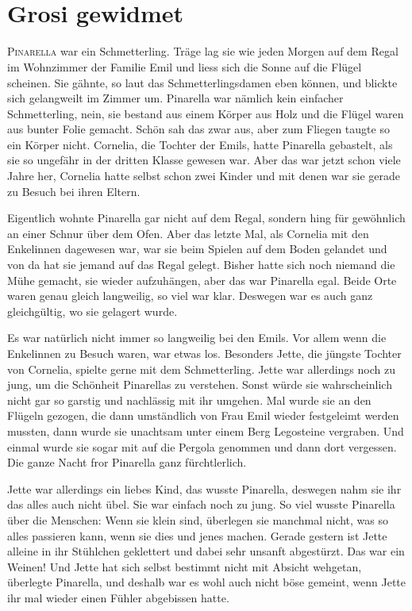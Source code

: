 \chapter*{{}\\\small \color{red} Grosi gewidmet}
\lettrine[lines=3]{\color{red}P}{inarella} war ein Schmetterling. Träge lag sie wie jeden Morgen auf dem Regal im Wohnzimmer der Familie Emil und liess sich die Sonne auf die Flügel scheinen. Sie gähnte, so laut das Schmetterlingsdamen eben können, und blickte sich gelangweilt im Zimmer um. Pinarella war nämlich kein einfacher Schmetterling, nein, sie bestand aus einem Körper aus Holz und die Flügel waren aus bunter Folie gemacht. Schön sah das zwar aus, aber zum Fliegen taugte so ein Körper nicht. Cornelia, die Tochter der Emils, hatte Pinarella gebastelt, als sie so ungefähr in der dritten Klasse gewesen war. Aber das war jetzt schon viele Jahre her, Cornelia hatte selbst schon zwei Kinder und mit denen war sie gerade zu Besuch bei ihren Eltern. 

Eigentlich wohnte Pinarella gar nicht auf dem Regal, sondern hing für gewöhnlich an einer Schnur über dem Ofen. Aber das letzte Mal, als Cornelia mit den Enkelinnen dagewesen war, war sie beim Spielen auf dem Boden gelandet und von da hat sie jemand auf das Regal gelegt. Bisher hatte sich noch niemand die Mühe gemacht, sie wieder aufzuhängen, aber das war Pinarella egal. Beide Orte waren genau gleich langweilig, so viel war klar. Deswegen war es auch ganz gleichgültig, wo sie gelagert wurde.

Es war natürlich nicht immer so langweilig bei den Emils. Vor allem wenn die Enkelinnen zu Besuch waren, war etwas los. Besonders Jette, die jüngste Tochter von Cornelia, spielte gerne mit dem Schmetterling. Jette war allerdings noch zu jung, um die Schönheit Pinarellas zu verstehen. Sonst würde sie wahrscheinlich nicht gar so garstig und nachlässig mit ihr umgehen. Mal wurde sie an den Flügeln gezogen, die dann umständlich von Frau Emil wieder festgeleimt werden mussten, dann wurde sie unachtsam unter einem Berg Legosteine vergraben. Und einmal wurde sie sogar mit auf die Pergola genommen und dann dort vergessen. Die ganze Nacht fror Pinarella ganz fürchtlerlich.

Jette war allerdings ein liebes Kind, das wusste Pinarella, deswegen nahm sie ihr das alles auch nicht übel. Sie war einfach noch zu jung. So viel wusste Pinarella über die Menschen: Wenn sie klein sind, überlegen sie manchmal nicht, was so alles passieren kann, wenn sie dies und jenes machen. Gerade gestern ist Jette alleine in ihr Stühlchen geklettert und dabei sehr unsanft abgestürzt. Das war ein Weinen! Und Jette hat sich selbst bestimmt nicht mit Absicht wehgetan, überlegte Pinarella, und deshalb war es wohl auch nicht böse gemeint, wenn Jette ihr mal wieder einen Fühler abgebissen hatte.


